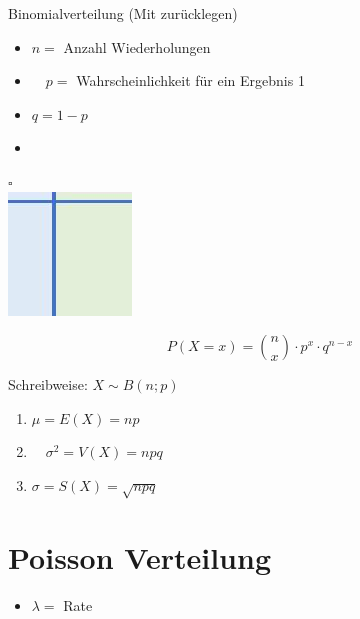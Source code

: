 \documentclass[10pt]{article}
\begin{document}
Binomialverteilung (Mit zurücklegen)

\begin{itemize}
  \item $n=$ Anzahl Wiederholungen
  \item $\quad p=$ Wahrscheinlichkeit für ein Ergebnis 1
  \item $q=1-p$
  \item 
\end{itemize}

$\square$\\
\includegraphics[width=\linewidth]{images/2024_12_29_e932069dd64ad17e4875g-07}

$$
P(X=x)=\binom{n}{x} \cdot p^{x} \cdot q^{n-x}
$$

Schreibweise: $X \sim B(n ; p)$

\begin{enumerate}
  \item $\mu=E(X)=n p$
  \item $\quad \sigma^{2}=V(X)=n p q$
  \item $\sigma=S(X)=\sqrt{n p q}$
\end{enumerate}

\section*{Poisson Verteilung}
\begin{itemize}
  \item $\lambda=$ Rate
\end{itemize}
\end{document}
